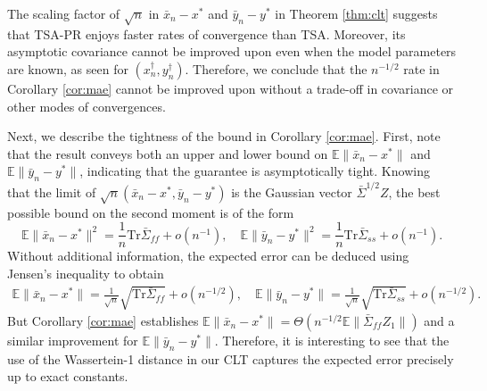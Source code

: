 The scaling factor of $\sqrt{n}$ in $\bar{x}_n - x^*$ and $\bar{y}_n - y^*$ in Theorem \ref{thm:clt} suggests that TSA-PR enjoys faster rates of convergence than TSA. 
Moreover, its asymptotic covariance cannot be improved upon even when the model parameters are known, as seen for $(x_n^\dagger, y_n^\dagger)$. 
Therefore, we conclude that the $n^{-1/2}$ rate in Corollary \ref{cor:mae} cannot be improved upon without a trade-off in covariance or other modes of convergences. 



Next, we describe the tightness of the bound in Corollary \ref{cor:mae}. 
First, note that the result conveys both an upper and lower bound on $\mathbb{E}\lVert \bar{x}_n - x^* \rVert$ and $\mathbb{E}\lVert \bar{y}_n -y^* \rVert$, indicating that the guarantee is asymptotically tight. 
Knowing that the limit of $\sqrt{n} (\bar{x}_n - x^*, \bar{y}_n - y^*)$ is the Gaussian vector $\bar{\Sigma}^{1/2} Z$, the best possible bound on the second moment is of the form 
\begin{equation}
    \mathbb{E}\lVert \bar{x}_n - x^* \rVert^2 = \frac{1}{n} \mathrm{Tr} \bar{\Sigma}_{ff} + o(n^{-1}) ,
    \quad
    \mathbb{E}\lVert \bar{y}_n -y^* \rVert^2 = \frac{1}{n} \mathrm{Tr}\bar{\Sigma}_{ss} + o(n^{-1}) 
    .
\end{equation}
Without additional information, the expected error can be deduced using Jensen's inequality to obtain
\begin{align*}
    \mathbb{E}\lVert \bar{x}_n - x^* \rVert = \frac{1}{\sqrt{n}} \sqrt{\mathrm{Tr} \bar{\Sigma}_{ff}} + o(n^{-1/2}) ,
    \quad
    \mathbb{E}\lVert \bar{y}_n - y^* \rVert = \frac{1}{\sqrt{n}} \sqrt{\mathrm{Tr} \bar{\Sigma}_{ss}} + o(n^{-1/2}) .
\end{align*}
But Corollary \ref{cor:mae} establishes $\mathbb{E}\lVert \bar{x}_n - x^*\rVert = \Theta (n^{-1/2} \mathbb{E}\lVert \bar{\Sigma}_{ff} Z_1 \rVert)$ and a similar improvement for $\mathbb{E}\lVert \bar{y}_n - y^*\rVert$.
Therefore, it is interesting to see that the use of the Wassertein-1 distance in our CLT captures the expected error precisely up to exact constants. 
